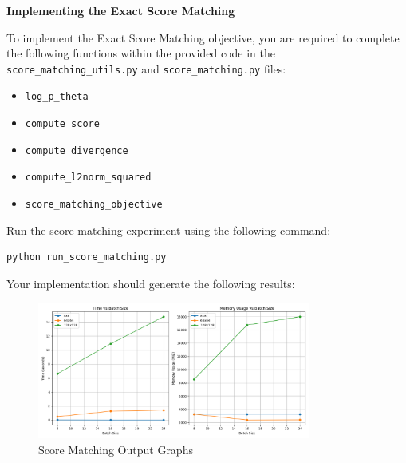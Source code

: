  \textbf{Implementing the Exact Score Matching}

To implement the Exact Score Matching objective, you are required to complete the following functions within the provided code in the \texttt{score\_matching\_utils.py} and \texttt{score\_matching.py} files:

\begin{itemize}
    \item \texttt{log\_p\_theta} 
    \item \texttt{compute\_score} 
    \item \texttt{compute\_divergence}
    \item \texttt{compute\_l2norm\_squared}
    \item \texttt{score\_matching\_objective}
\end{itemize}

Run the score matching experiment using the following command:
\begin{lstlisting}[language=bash]
    python run_score_matching.py
\end{lstlisting}

Your implementation should generate the following results:
\begin{figure}[H]
    \centering
    \includegraphics[width=0.8\textwidth]{./figures/score_matching_results}
    \caption{Score Matching Output Graphs}
\end{figure}